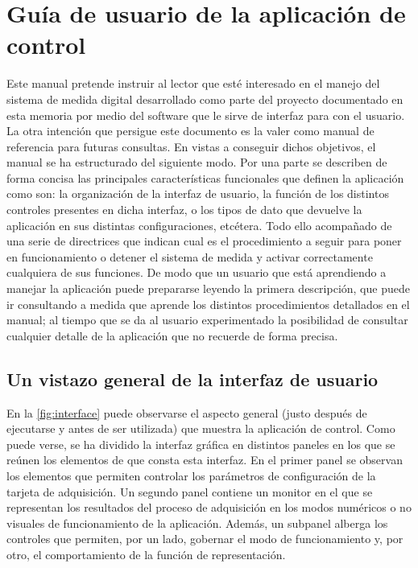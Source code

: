\chapter{Guía de usuario de la aplicación de control}\label{chap:appendixA}

Este manual pretende instruir al lector que esté interesado en el manejo
del sistema de medida digital desarrollado como parte del proyecto
documentado en esta memoria por medio del software que le sirve de interfaz
para con el usuario. La otra intención que persigue este documento es la
valer como manual de referencia para futuras consultas. En vistas a
conseguir dichos objetivos, el manual se ha estructurado del siguiente
modo. Por una parte se describen de forma concisa las principales
características funcionales que definen la aplicación como son:
la organización de la interfaz de usuario, la función de los distintos
controles presentes en dicha interfaz, o los tipos de dato que devuelve la
aplicación en sus distintas configuraciones, etcétera. Todo ello acompañado
de una serie de directrices que indican cual es el procedimiento a seguir
para poner en funcionamiento o detener el sistema de medida y activar
correctamente cualquiera de sus funciones. De modo que un usuario que está
aprendiendo a manejar la aplicación puede prepararse leyendo la primera
descripción, que puede ir consultando a medida que aprende los distintos
procedimientos detallados en el manual; al tiempo que se da al usuario
experimentado la posibilidad de consultar cualquier detalle de la
aplicación que no recuerde de forma precisa.


\section{Un vistazo general de la interfaz de usuario}

En la \vref{fig:interface} puede observarse el aspecto general (justo
después de ejecutarse y antes de ser utilizada) que muestra la aplicación
de control. Como puede verse, se ha dividido la interfaz gráfica en
distintos paneles en los que se reúnen los elementos de que consta esta
interfaz. En el primer panel se observan los elementos que permiten
controlar los parámetros de configuración de la tarjeta de adquisición. Un
segundo panel contiene un monitor en el que se representan los resultados
del proceso de adquisición en los modos numéricos o no visuales de
funcionamiento de la aplicación. Además, un subpanel alberga los controles
que permiten, por un lado, gobernar el modo de funcionamiento y, por otro,
el comportamiento de la función de representación.

